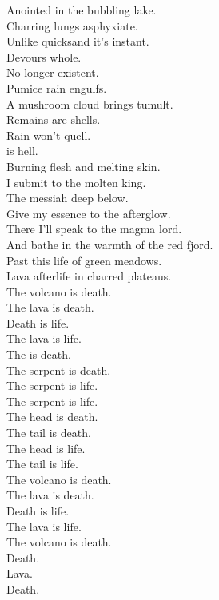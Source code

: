 Anointed in the bubbling lake. \\
Charring lungs asphyxiate. \\
Unlike quicksand it's instant. \\
Devours whole. \\
No longer existent. \\
Pumice rain engulfs. \\
A mushroom cloud brings tumult. \\
Remains are shells. \\
Rain won't quell. \\
 is hell. \\

Burning flesh and melting skin. \\
I submit to the molten king. \\
The messiah deep below. \\
Give my essence to the afterglow. \\
There I'll speak to the magma lord. \\
And bathe in the warmth of the red fjord. \\
Past this life of green meadows. \\
Lava afterlife in charred plateaus. \\

The volcano is death. \\
The lava is death. \\
Death is life. \\
The lava is life. \\

The  is death. \\
The serpent is death. \\
The serpent is life. \\
The serpent is life. \\

The head is death. \\
The tail is death. \\
The head is life. \\
The tail is life. \\

The volcano is death. \\
The lava is death. \\
Death is life. \\
The lava is life. \\

The volcano is death. \\
Death. \\
Lava. \\
Death. \\

